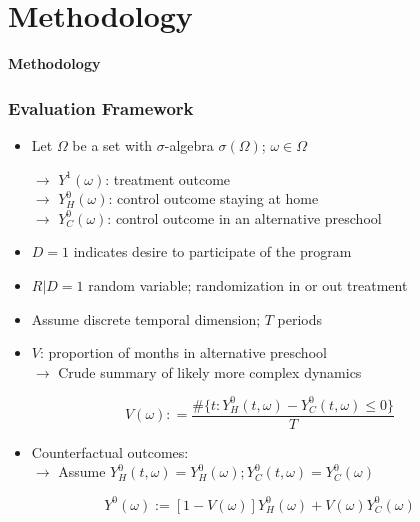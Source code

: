 \documentclass[static]{JJH-Beamer}
\begin{document}

\section{Methodology}

\begin{frame}[noframenumbering]

\begin{block}{}
\begin{center}
\textbf{Methodology}
\end{center}
\end{block}

\end{frame}


\begin{frame}
\frametitle{Evaluation Framework}
\begin{itemize}
	\item Let $\Omega$ be a set with $\sigma$-algebra $\sigma(\Omega)$; $\omega \in \Omega$ \\
	\begin{scriptsize}
		$\rightarrow$ $Y^1 \left( \omega \right)     $: treatment outcome  \\ 
		$\rightarrow$ $Y_H^0 \left(\omega \right)  $: control outcome staying at home \\
		$\rightarrow$ $Y_C^0 \left( \omega \right) $: control outcome in an alternative preschool
	\end{scriptsize}
	    \item $D=1$ indicates desire to participate of the program
	    \item  $R | D =1 $ random variable; randomization in or out treatment
	    \item Assume discrete temporal dimension; $T$ periods
		\item $V$: proportion of months in alternative preschool \\
		$\rightarrow$ Crude summary of likely more complex dynamics
\end{itemize}
\begin{equation}
	V(\omega)  : = \frac{\# \{ t : Y_H^0 \left( t, \omega \right) - Y_C^0 \left( t, \omega \right)  \leq 0 \}}{T}
\end{equation}

\begin{itemize}
	\item Counterfactual outcomes: \\
	$\rightarrow$ Assume $Y_H^0 \left( t,\omega \right) = Y_H^0 \left( \omega \right); Y_C^0\left(t,\omega\right)=Y_C^0\left(\omega\right)$ 
\end{itemize}

\begin{equation}
Y^0 \left( \omega \right) := \left[ 1 - V\left( \omega \right) \right] Y_H^0 \left( \omega \right)  +  V\left( \omega \right) Y_C^0 \left( \omega \right)   
\end{equation}
\end{frame}
\end{document}
